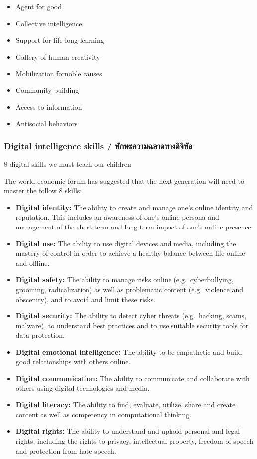 \documentclass[]{book}
\newcommand{\taibf}{\fontspec[Scale=1.3]{[THSarabunNew Bold.ttf:script=thai]}}
\begin{document}
\begin{itemize}
\item
  \href{https://youtu.be/po01VlNvCcQ}{Agent for good}
\item
  Collective intelligence
\item
  Support for life-long learning
\item
  Gallery of human creativity
\item
  Mobilization fornoble causes
\item
  Community building
\item
  Access to information
\item
  \href{https://youtu.be/dRl8EIhrQjQ}{Antisocial behaviors}
\end{itemize}

\hypertarget{digital-intelligence-skills-}{%
\subsubsection{\texorpdfstring{Digital intelligence skills / \taibf ทักษะความฉลาดทางดิจิทัล}{Digital intelligence skills / ทักษะความฉลาดทางดิจิทัล}}\label{digital-intelligence-skills-}}

8 digital skills we must teach our children

The world economic forum has suggested that the next generation will need to master the follow 8 skills: \citep{Park2016a}

\begin{itemize}
\item
  \textbf{Digital identity:} The ability to create and manage one's online identity and reputation. This includes an awareness of one's online persona and management of the short-term and long-term impact of one's online presence.
\item
  \textbf{Digital use:} The ability to use digital devices and media, including the mastery of control in order to achieve a healthy balance between life online and offline.
\item
  \textbf{Digital safety:} The ability to manage risks online (e.g.~cyberbullying, grooming, radicalization) as well as problematic content (e.g.~violence and obscenity), and to avoid and limit these risks.
\item
  \textbf{Digital security:} The ability to detect cyber threats (e.g.~hacking, scams, malware), to understand best practices and to use suitable security tools for data protection.
\item
  \textbf{Digital emotional intelligence:} The ability to be empathetic and build good relationships with others online.
\item
  \textbf{Digital communication:} The ability to communicate and collaborate with others using digital technologies and media.
\item
  \textbf{Digital literacy:} The ability to find, evaluate, utilize, share and create content as well as competency in computational thinking.
\item
  \textbf{Digital rights:} The ability to understand and uphold personal and legal rights, including the rights to privacy, intellectual property, freedom of speech and protection from hate speech.
\end{itemize}
\end{document}
